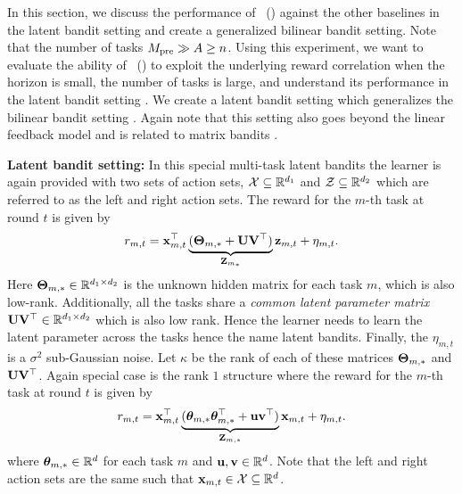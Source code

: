 In this section, we discuss the performance of \pred\ (\gt) against the other baselines in the latent bandit setting and create a generalized bilinear bandit setting. 
%
%
Note that the number of tasks $M_{\text{pre}} \gg A \geq n$.
%
%
Using this experiment, we want to evaluate the ability of \pred\ (\gt) to exploit the underlying reward correlation when the horizon is small, the number of tasks is large, and understand its performance in the latent bandit setting \citep{hong2020latent, maillard2014latent, pal2023optimal, kveton2017stochastic}.
%
We create a latent bandit setting which generalizes the bilinear bandit setting \citep{jun2019bilinear, lu2021low, kang2022efficient, mukherjee2023multi}.
%
Again note that this setting also goes beyond the linear feedback model \citep{abbasi2011improved, lattimore2020bandit} and is related to matrix bandits \citep{yang2020reinforcement}.


\textbf{Latent bandit setting:} In this special multi-task latent bandits the learner is again provided with two sets of action sets, $\mathcal{X}\subseteq\mathbb{R}^{d_1}$ and $\mathcal{Z}\subseteq\mathbb{R}^{d_2}$ which are referred to as the left and right action sets. 
% 
The reward for the $m$-th task at round $t$ is given by
\begin{align*}
    r_{m,t} = \mathbf{x}_{m,t}^\top \underbrace{(\mathbf{\Theta}_{m,*} + \mathbf{U}\mathbf{V}^\top)}_{\mathbf{Z}_{m_*}}\mathbf{z}_{m,t} + \eta_{m,t}.
\end{align*}
Here  $\mathbf{\Theta}_{m,*}\in\mathbb{R}^{d_1\times d_2}$ is the unknown hidden matrix for each task $m$, which is also low-rank. 
%
Additionally, all the tasks share a \emph{common latent parameter matrix} $\mathbf{U}\mathbf{V}^\top \in \mathbb{R}^{d_1\times d_2}$ which is also low rank. Hence the learner needs to learn the latent parameter across the tasks hence the name latent bandits.
%
Finally, the $\eta_{m,t}$ is a $\sigma^2$ sub-Gaussian noise. Let $\kappa$ be the rank of each of these matrices $\mathbf{\Theta}_{m, *}$ and $\mathbf{U}\mathbf{V}^\top$.
%
Again special case is the rank $1$ structure where the reward for the $m$-th task at round $t$ is given by
\begin{align*}
    r_{m,t} = \mathbf{x}_{m,t}^\top \underbrace{(\boldsymbol{\theta}_{m,*}\boldsymbol{\theta}_{m,*}^\top + \mathbf{u}\mathbf{v}^\top)}_{\mathbf{Z}_{m, *}}\mathbf{x}_{m,t} + \eta_{m,t}.
\end{align*}
%
where $\boldsymbol{\theta}_{m,*}\in\mathbb{R}^d$ for each task $m$ and $\mathbf{u}, \mathbf{v}\in\mathbb{R}^d$. Note that the left and right action sets are the same such that $\mathbf{x}_{m,t} \in \mathcal{X} \subseteq \mathbb{R}^{d}$.

